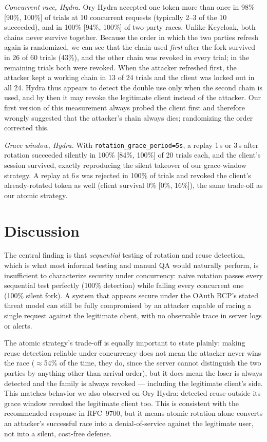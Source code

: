 \documentclass[conference]{IEEEtran}
\begin{document}
\emph{Concurrent race, Hydra.} Ory Hydra accepted one token more than
once in 98\% [90\%, 100\%] of trials at 10 concurrent requests (typically
2--3 of the 10 succeeded), and in 100\% [94\%, 100\%] of two-party races.
Unlike Keycloak, both chains never survive together. Because the order in
which the two parties refresh again is randomized, we can see that the
chain used \emph{first} after the fork survived in 26 of 60 trials (43\%),
and the other chain was revoked in every trial; in the remaining trials
both were revoked. When the attacker refreshed first, the attacker kept a
working chain in 13 of 24 trials and the client was locked out in all 24.
Hydra thus appears to detect the double use only when the second chain is
used, and by then it may revoke the legitimate client instead of the
attacker. Our first version of this measurement always probed the client
first and therefore wrongly suggested that the attacker's chain always
dies; randomizing the order corrected this.

\emph{Grace window, Hydra.} With \texttt{rotation\_grace\_period=5s},
a replay 1\,s or 3\,s after rotation succeeded silently in 100\% [84\%,
100\%] of 20 trials each, and the client's session survived, exactly
reproducing the silent takeover of our grace-window strategy. A replay
at 6\,s was rejected in 100\% of trials and revoked the client's
already-rotated token as well (client survival 0\% [0\%, 16\%]), the
same trade-off as our atomic strategy.

\section{Discussion}

The central finding is that \emph{sequential} testing of rotation and
reuse detection, which is what most informal testing and manual QA would
naturally perform, is insufficient to characterize security under
concurrency: naive rotation passes every sequential test perfectly (100\%
detection) while failing every concurrent one (100\% silent fork). A
system that appears secure under the OAuth BCP's stated threat model can
still be fully compromised by an attacker capable of racing a single
request against the legitimate client, with no observable trace in server
logs or alerts.

The atomic strategy's trade-off is equally important to state plainly:
making reuse detection reliable under concurrency does not mean the
attacker never wins the race ($\approx$54\% of the time, they do, since the
server cannot distinguish the two parties by anything other than arrival
order), but it does mean the loser is always detected and the family is
always revoked --- including the legitimate client's side. This matches
behavior we also observed on Ory Hydra: detected reuse outside its grace
window revoked the legitimate client too. This is consistent with the
recommended response in RFC~9700, but it means atomic rotation alone
converts an attacker's successful race into a denial-of-service against
the legitimate user, not into a silent, cost-free defense.
\end{document}
